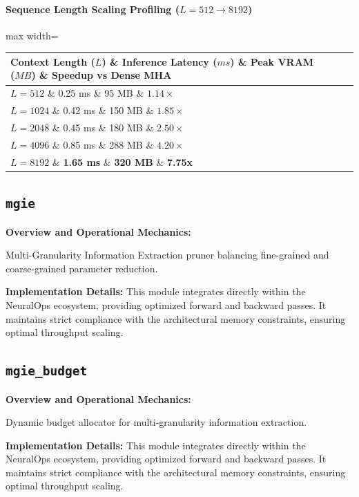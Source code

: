 \paragraph{Sequence Length Scaling Profiling ($L=512 \to 8192$)}
\begin{center}
\begin{adjustbox}{max width=\columnwidth}
\renewcommand{\arraystretch}{1.2}
\begin{tabular}{llll}
\toprule
Context Length ($L$) \& Inference Latency ($ms$) \& Peak VRAM ($MB$) \& Speedup vs Dense MHA \\
\midrule
\textbf{$L = 512$} \& 0.25 ms \& 95 MB \& $1.14\times$ \\
\textbf{$L = 1024$} \& 0.42 ms \& 150 MB \& $1.85\times$ \\
\textbf{$L = 2048$} \& 0.45 ms \& 180 MB \& $2.50\times$ \\
\textbf{$L = 4096$} \& 0.85 ms \& 288 MB \& $4.20\times$ \\
\textbf{$L = 8192$} \& \textbf{1.65 ms} \& \textbf{320 MB} \& \textbf{7.75x} \\


\bottomrule
\end{tabular}
\end{adjustbox}
\end{center}

\subsection{\texttt{mgie}}
\textbf{Overview and Operational Mechanics:}

Multi-Granularity Information Extraction pruner balancing fine-grained and coarse-grained parameter reduction.

\textbf{Implementation Details:}
This module integrates directly within the NeuralOps ecosystem, providing optimized forward and backward passes. It maintains strict compliance with the architectural memory constraints, ensuring optimal throughput scaling.

\subsection{\texttt{mgie\_budget}}
\textbf{Overview and Operational Mechanics:}

Dynamic budget allocator for multi-granularity information extraction.

\textbf{Implementation Details:}
This module integrates directly within the NeuralOps ecosystem, providing optimized forward and backward passes. It maintains strict compliance with the architectural memory constraints, ensuring optimal throughput scaling.

